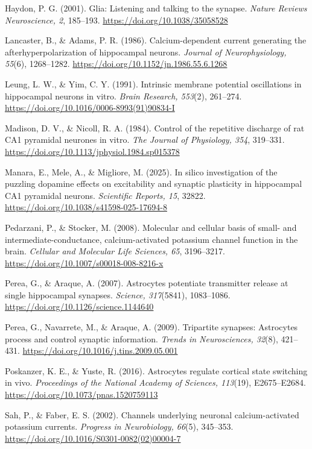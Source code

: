 \documentclass[12pt,a4paper]{report}
\begin{document}
Haydon, P. G. (2001). Glia: Listening and talking to the synapse. \textit{Nature Reviews Neuroscience, 2}, 185--193. \url{https://doi.org/10.1038/35058528}

Lancaster, B., \& Adams, P. R. (1986). Calcium-dependent current generating the afterhyperpolarization of hippocampal neurons. \textit{Journal of Neurophysiology, 55}(6), 1268--1282. \url{https://doi.org/10.1152/jn.1986.55.6.1268}

Leung, L. W., \& Yim, C. Y. (1991). Intrinsic membrane potential oscillations in hippocampal neurons in vitro. \textit{Brain Research, 553}(2), 261--274. \url{https://doi.org/10.1016/0006-8993(91)90834-I}

Madison, D. V., \& Nicoll, R. A. (1984). Control of the repetitive discharge of rat CA1 pyramidal neurones in vitro. \textit{The Journal of Physiology, 354}, 319--331. \url{https://doi.org/10.1113/jphysiol.1984.sp015378}

Manara, E., Mele, A., \& Migliore, M. (2025). In silico investigation of the puzzling dopamine effects on excitability and synaptic plasticity in hippocampal CA1 pyramidal neurons. \textit{Scientific Reports, 15}, 32822. \url{https://doi.org/10.1038/s41598-025-17694-8}

Pedarzani, P., \& Stocker, M. (2008). Molecular and cellular basis of small- and intermediate-conductance, calcium-activated potassium channel function in the brain. \textit{Cellular and Molecular Life Sciences, 65}, 3196--3217. \url{https://doi.org/10.1007/s00018-008-8216-x}

Perea, G., \& Araque, A. (2007). Astrocytes potentiate transmitter release at single hippocampal synapses. \textit{Science, 317}(5841), 1083--1086. \url{https://doi.org/10.1126/science.1144640}

Perea, G., Navarrete, M., \& Araque, A. (2009). Tripartite synapses: Astrocytes process and control synaptic information. \textit{Trends in Neurosciences, 32}(8), 421--431. \url{https://doi.org/10.1016/j.tins.2009.05.001}

Poskanzer, K. E., \& Yuste, R. (2016). Astrocytes regulate cortical state switching in vivo. \textit{Proceedings of the National Academy of Sciences, 113}(19), E2675--E2684. \url{https://doi.org/10.1073/pnas.1520759113}

Sah, P., \& Faber, E. S. (2002). Channels underlying neuronal calcium-activated potassium currents. \textit{Progress in Neurobiology, 66}(5), 345--353. \url{https://doi.org/10.1016/S0301-0082(02)00004-7}
\end{document}
